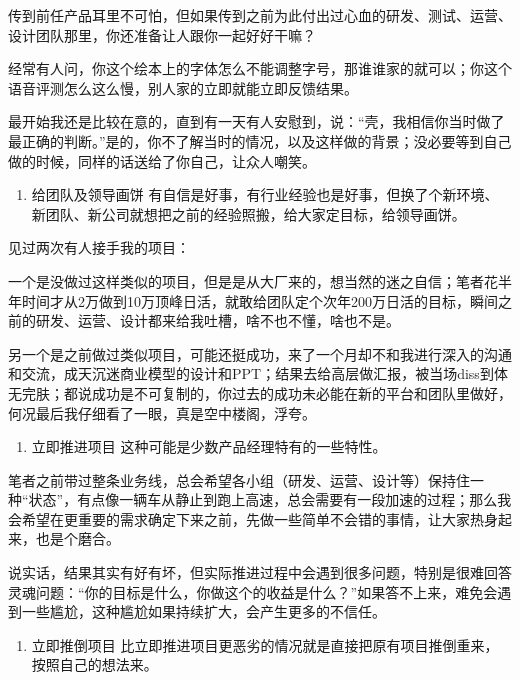 \documentclass[letterpaper,10pt,english]{sphinxmanual}
\begin{document}
传到前任产品耳里不可怕，但如果传到之前为此付出过心血的研发、测试、运营、设计团队那里，你还准备让人跟你一起好好干嘛？

经常有人问，你这个绘本上的字体怎么不能调整字号，那谁谁家的就可以；你这个语音评测怎么这么慢，别人家的立即就能立即反馈结果。

最开始我还是比较在意的，直到有一天有人安慰到，说：“壳，我相信你当时做了最正确的判断。”是的，你不了解当时的情况，以及这样做的背景；没必要等到自己做的时候，同样的话送给了你自己，让众人嘲笑。
\begin{enumerate}
%
\setcounter{enumi}{1}
\item {} 
给团队及领导画饼
有自信是好事，有行业经验也是好事，但换了个新环境、新团队、新公司就想把之前的经验照搬，给大家定目标，给领导画饼。

\end{enumerate}

见过两次有人接手我的项目：

一个是没做过这样类似的项目，但是是从大厂来的，想当然的迷之自信；笔者花半年时间才从2万做到10万顶峰日活，就敢给团队定个次年200万日活的目标，瞬间之前的研发、运营、设计都来给我吐槽，啥不也不懂，啥也不是。

另一个是之前做过类似项目，可能还挺成功，来了一个月却不和我进行深入的沟通和交流，成天沉迷商业模型的设计和PPT；结果去给高层做汇报，被当场diss到体无完肤；都说成功是不可复制的，你过去的成功未必能在新的平台和团队里做好，何况最后我仔细看了一眼，真是空中楼阁，浮夸。
\begin{enumerate}
%
\setcounter{enumi}{2}
\item {} 
立即推进项目 这种可能是少数产品经理特有的一些特性。

\end{enumerate}

笔者之前带过整条业务线，总会希望各小组（研发、运营、设计等）保持住一种“状态”，有点像一辆车从静止到跑上高速，总会需要有一段加速的过程；那么我会希望在更重要的需求确定下来之前，先做一些简单不会错的事情，让大家热身起来，也是个磨合。

说实话，结果其实有好有坏，但实际推进过程中会遇到很多问题，特别是很难回答灵魂问题：“你的目标是什么，你做这个的收益是什么？”如果答不上来，难免会遇到一些尴尬，这种尴尬如果持续扩大，会产生更多的不信任。
\begin{enumerate}
%
\setcounter{enumi}{3}
\item {} 
立即推倒项目
比立即推进项目更恶劣的情况就是直接把原有项目推倒重来，按照自己的想法来。

\end{enumerate}
\end{document}
